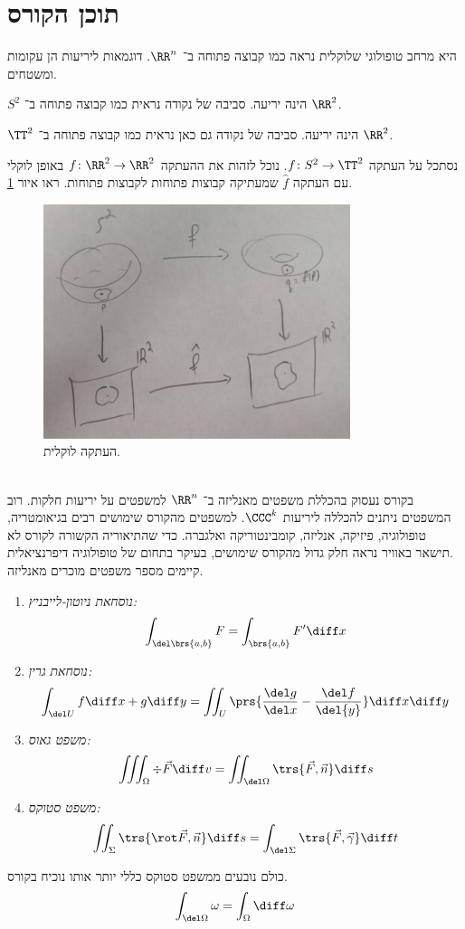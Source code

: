 \documentclass[a4paper,10pt,twoside,openany]{book}
\begin{document}
\section{תוכן הקורס}
היא מרחב טופולוגי שלוקלית נראה כמו קבוצה פתוחה ב־%
$\RR^n$.%
דוגמאות ליריעות הן עקומות ומשטחים.
\begin{example}
$S^2$
הינה יריעה. סביבה של נקודה נראית כמו קבוצה פתוחה ב־%
$\RR^2$.
\end{example}
\begin{example}
$\TT^2$
הינה יריעה. סביבה של נקודה גם כאן נראית כמו קבוצה פתוחה ב־%
$\RR^2$.
\end{example}
נסתכל על העתקה
$f \colon S^2 \to \TT^2$.
נוכל לזהות את ההעתקה
$f \colon \RR^2 \to \RR^2$
באופן לוקלי עם העתקה
$\hat{f}$
שמעתיקה קבוצות פתוחות לקבוצות פתוחות. ראו איור
\ref{fig1}.
\begin{figure}[ht]
\centering
\caption{העתקה לוקלית.}
\label{fig1}
\includegraphics[width=0.8\textwidth]{sources/figure1}
\end{figure}
\\
בקורס נעסוק בהכללת משפטים מאנליזה ב־%
$\RR^n$
למשפטים על יריעות חלקות.
רוב המשפטים ניתנים להכללה ליריעות $\CCC^k$.
למשפטים מהקורס שימושים רבים בגיאומטריה, טופולוגיה, פיזיקה, אנליזה, קומבינטוריקה ואלגברה. כדי שהתיאוריה הקשורה לקורס לא תישאר באוויר נראה חלק גדול מהקורס שימושים, בעיקר בתחום של טופולוגיה דיפרנציאלית.
\\
קיימים מספר משפטים מוכרים מאנליזה.
\\
\begin{examples}
\begin{enumerate}
\item \emph{נוסחאת ניוטון-לייבניץ:}
\[\int_{\del\brs{a,b}} F = \int_{\brs{a,b}} F' \diff x\]
\item \emph{נוסחאת גרין:}
\[\int_{\del U} f\diff x + g \diff y = \iint_{U} \prs{\frac{\del g}{\del x} - \frac{\del f}{\del{y}}} \diff x \diff y\]
\item \emph{משפט גאוס:}
\[\iiint_{\Omega} \div \vec{F} \diff v = \iint_{\del \Omega} \trs{\vec{F},\vec{n}} \diff s\]
\item \emph{משפט סטוקס:}
\[\iint_{\Sigma} \trs{\rot \vec{F}, \vec{n}} \diff s = \int_{\del \Sigma} \trs{\vec{F}, \vec{\gamma}} \diff t\]
\end{enumerate}
\end{examples}
כולם נובעים ממשפט סטוקס כללי יותר אותו נוכיח בקורס.
\[\int_{\del \Omega} \omega = \int_{\Omega} \diff \omega\]
\end{document}
